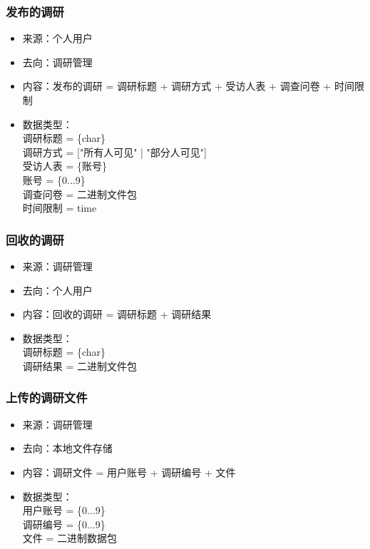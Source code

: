 {            \subsubsection{\color{red} 发布的调研}
            \begin{itemize}
                \item 来源：个人用户
                \item 去向：调研管理
                \item 内容：发布的调研 = 调研标题 + 调研方式 + {受访人表} + 调查问卷 + 时间限制
                \item 数据类型：\\
                    调研标题 = \{char\}\\
                    调研方式 = ["所有人可见" | "部分人可见"] \\
                    受访人表 = \{账号\}\\
                    账号 = \{0...9\}\\
                    调查问卷 = 二进制文件包 \\
                    时间限制 = time \\
            \end{itemize}
            \subsubsection{\color{red} 回收的调研}
            \begin{itemize}
                \item 来源：调研管理
                \item 去向：个人用户
                \item 内容：回收的调研 = 调研标题 + 调研结果
                \item 数据类型：\\
                    调研标题 = \{char\}\\
                    调研结果 = 二进制文件包\\
            \end{itemize}
            
            \subsubsection{\color{red} 上传的调研文件}
            \begin{itemize}
            \item 来源：调研管理
            \item 去向：本地文件存储
            \item 内容：调研文件 = 用户账号 + 调研编号 + 文件
            \item 数据类型：\\
            用户账号 = \{0...9\}\\
            调研编号 = \{0...9\}\\
            文件 = 二进制数据包\\
            \end{itemize}

}
